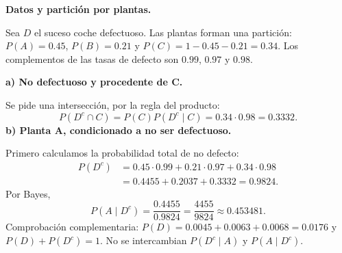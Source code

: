 \textbf{Datos y partición por plantas.}\par\nopagebreak[4]
Sea $D$ el suceso coche defectuoso. Las plantas forman una partición: $P(A)=0.45$, $P(B)=0.21$ y $P(C)=1-0.45-0.21=0.34$. Los complementos de las tasas de defecto son $0.99$, $0.97$ y $0.98$.

\textbf{a) No defectuoso y procedente de C.}\par\nopagebreak[4]
Se pide una intersección, por la regla del producto:
\[
\boxed{P(D^c\cap C)=P(C)P(D^c\mid C)=0.34\cdot0.98=0.3332.}
\]
\textbf{b) Planta A, condicionado a no ser defectuoso.}\par\nopagebreak[4]
Primero calculamos la probabilidad total de no defecto:
\[
\begin{aligned}
P(D^c)&=0.45\cdot0.99+0.21\cdot0.97+0.34\cdot0.98\\
&=0.4455+0.2037+0.3332=0.9824.
\end{aligned}
\]
Por Bayes,
\[
\boxed{P(A\mid D^c)=\frac{0.4455}{0.9824}
=\frac{4455}{9824}\approx0.453481.}
\]
Comprobación complementaria: $P(D)=0.0045+0.0063+0.0068=0.0176$ y $P(D)+P(D^c)=1$. No se intercambian $P(D^c\mid A)$ y $P(A\mid D^c)$.
